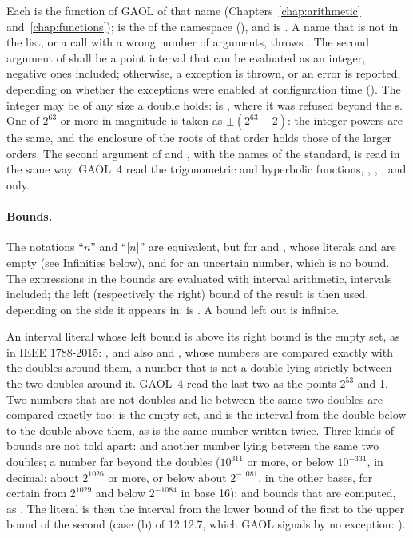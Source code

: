\noindent
Each is the function of GAOL of that name (Chapters~\ref{chap:arithmetic}
and~\ref{chap:functions});  is the  of the namespace
 (), and  is
. A name that is not in the list, or a call with a
wrong number of arguments, throws . The second
argument of  shall be a point interval that can be evaluated
as an integer, negative ones included; otherwise, a 
exception is thrown, or an error is reported, depending on whether the
exceptions were enabled at configuration time
().\newinvfive{} The integer may be of any size a
double holds:  is
, where it was refused beyond the
s. One of $2^{63}$ or more in magnitude is taken as
$\pm(2^{63}-2)$: the integer powers are the same, and the enclosure of the
roots of that order holds those of the larger orders. The second argument of
 and , with the names of the standard, is read in the
same way. GAOL~4 read the trigonometric and hyperbolic functions,
, , ,  and  only.

\paragraph{Bounds.} The notations ``$n$'' and ``[$n$]'' are equivalent, but for
 and , whose literals \code{[inf]} and \code{[-inf]} are
empty (see Infinities below), and for an uncertain number, which is no bound. The
expressions in the bounds are evaluated with interval arithmetic, intervals
included; the left (respectively the right) bound of the result is then
used, depending on the side it appears in:  is
. A bound left out is infinite.

An interval literal \code{[l, u]} whose left bound is above its right bound
is the empty set, as in IEEE 1788-2015: , and also
 and
, whose numbers are compared exactly with
the doubles around them, a number that is not a double lying strictly
between the two doubles around it.\newinvfive{} GAOL~4 read the last two as
the points $2^{53}$ and 1. Two numbers that are not doubles and lie between
the same two doubles are compared exactly too:
 is the empty set, and
 is the interval from
the double below to the double above them, as is the same number written
twice. Three kinds of bounds are not told apart:  and another
number lying between the same two doubles; a number far beyond the doubles
($10^{311}$ or more, or below $10^{-331}$, in decimal; about $2^{1026}$ or more,
or below about $2^{-1081}$, in the other bases, for certain from $2^{1029}$ and
below $2^{-1084}$ in base 16); and bounds
that are computed, as . The literal is then the interval from the
lower bound of the first to the upper bound of the second (case (b) of
12.12.7, which GAOL signals by no exception: ).

